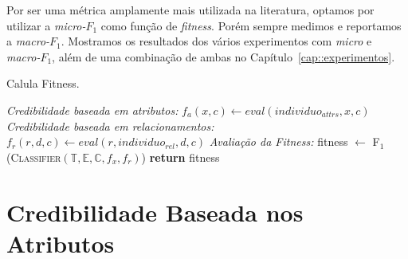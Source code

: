 


Por ser uma métrica amplamente mais utilizada na literatura, optamos por utilizar a \textit{micro-$F_1$} como função de \textit{fitness}. Porém sempre medimos e reportamos a \textit{macro-$F_1$}. Mostramos os resultados dos vários experimentos com \textit{micro} e \textit{macro-$F_1$}, além de uma combinação de ambas no Capítulo~\ref{cap::experimentos}.


\algrenewcommand{}
\algrenewcommand{}
\algrenewcommand{}
\algrenewcommand{} %

\begin{algorithm}
\centering
\caption{Calula Fitness.}
\label{alg::fitness}
\begin{algorithmic}[1]
{
{}
  \State \textit{Credibilidade baseada em atributos:}
      \State $f_a(x,c) \gets eval(individuo_{attrs}, x, c)$
    \EndFor
  \EndFor
  \State \textit{Credibilidade baseada em relacionamentos:}
            \State $f_r(r,d,c) \gets eval(r,individuo_{rel}, d, c)$
        \EndFor
    \EndFor
  \EndFor
  \State \textit{Avaliação da Fitness:}
  \State fitness $\gets$ \textsc{F$_1$}(\textsc{Classifier}$(\mathbb{T}, \mathbb{E}, \mathbb{C}, f_x, f_r)$)
  \State \textbf{return} fitness
\EndFunction
}
\end{algorithmic}
\end{algorithm}


\section{Credibilidade Baseada nos Atributos}
\label{sec::pg_cred_baseada_conteudo}

